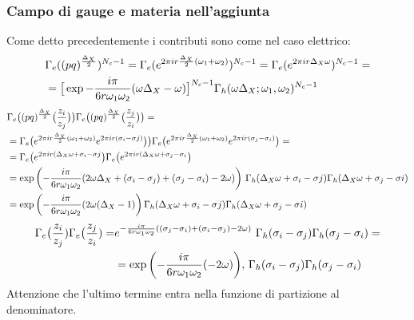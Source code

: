 \documentclass[a4paper,12pt]{article}
\begin{document}
\subsubsection*{Campo di gauge e materia nell'aggiunta}
Come detto precedentemente i contributi sono come nel caso elettrico:
\begin{align*}
& \Gamma_e((pq)^{\frac{\Delta_X}{2}})^{N_c -1} =
\Gamma_e( e^{2 \pi i r  {\Delta_X \over 2} (\omega_1 + \omega_2)})^{N_c-1} =  \Gamma_e( e^{2 \pi i r  \Delta_X \omega })^{N_c-1} = \\
&=\big[ \exp{- \frac{i \pi} {6 r \omega_1 \omega_2 }  ( \omega \Delta_X - \omega) }\big]^{N_c-1} \Gamma_h ( \omega \Delta_X ; \omega_1, \omega_2)^{N_c-1}
\end{align*}
 \begin{align*}
 & \Gamma_e\big( (pq)^{\frac{\Delta_X}{2}} \big( { z_i \over z_j} \big) \big) \Gamma_e \big( (pq)^{\frac{\Delta_X}{2}} \big( { z_j \over z_i} \big) \big) = \\
&= \Gamma_e\big( e^{2 \pi i r \frac{\Delta_X}{2} (\omega_1 + \omega_2)} e^{ 2 \pi  i r (\sigma_i - \sigma j)} \big) \big) \Gamma_e \big( e^{ 2 \pi i r \frac{\Delta_X}{2} (\omega_1 + \omega_2)}  e^{ 2 \pi i r (\sigma_j - \sigma_i)} \big) =  \\
&= \Gamma_e\big( e^{2 \pi  i r (\Delta_X \omega +\sigma_i - \sigma j} \big) \Gamma_e \big(  e^{2 \pi  i r (\Delta_X \omega +\sigma_j - \sigma_i} \big) \\
 & = \exp \bigg( {- \frac{i \pi} {6 r \omega_1 \omega_2 }  ( 2 \omega \Delta_X + (\sigma_i - \sigma_j)+(\sigma_j - \sigma_i) - 2 \omega) }\bigg)\, \, \Gamma_h ( \Delta_X \omega + \sigma_i - \sigma j ) \Gamma_h ( \Delta_X \omega + \sigma_j - \sigma i) \\
 & = \exp\bigg({- \frac{i \pi} {6 r \omega_1 \omega_2 }  ( 2 \omega (\Delta_X - 1) }\bigg)  \, \Gamma_h ( \Delta_X \omega + \sigma_i - \sigma j ) \Gamma_h ( \Delta_X \omega + \sigma_j - \sigma i) 
\end{align*}
\begin{align*}
  \Gamma_e\big( {z_i \over z_j})\Gamma_e\big( {z_j \over z_i}) = &e^{- \frac{i \pi} {6 r \omega_1 \omega_2 }  ( (\sigma_j - \sigma_i) + (\sigma_i- \sigma_j) - 2 \omega)} \, \, \Gamma_h (  \sigma_i - \sigma_j) \Gamma_h (  \sigma_j - \sigma_i) =\\
& = \exp \bigg( {- \frac{i \pi} {6 r \omega_1 \omega_2 }  ( - 2 \omega)}  \bigg) , \, \Gamma_h (  \sigma_i - \sigma_j) \Gamma_h (  \sigma_j - \sigma_i)
\end{align*}
Attenzione che l'ultimo termine entra nella funzione di partizione al denominatore.\\
\end{document}
